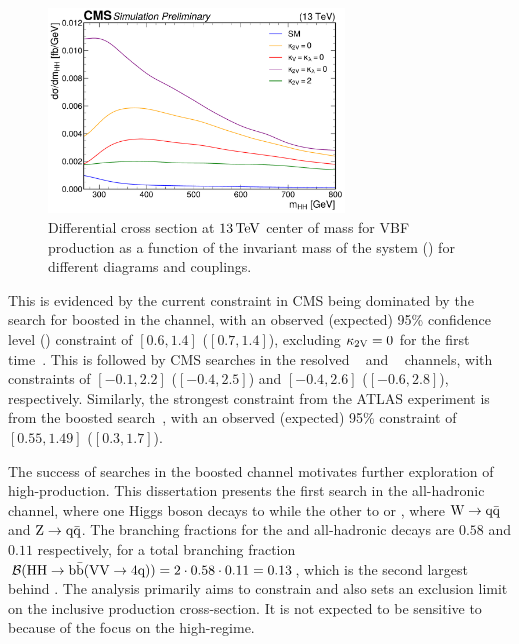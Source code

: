 \begin{figure}[ht]
    \centering
    \includegraphics[width=0.7\textwidth]{figures/05-HH/production/diagrams_prelim.pdf}
    \caption{Differential cross section at $13\,\text{Te\hspace{-.08em}V}$ center of mass for VBF \HH production as a function of the invariant mass of the \HH system (\mHH) for different diagrams and couplings.}
    \label{fig:05_intro_mhh}
\end{figure}

This is evidenced by the current \kapvv constraint in CMS being dominated by the search for boosted \HH in the \bbbb channel, with an observed (expected) 95\% confidence level (\CL) constraint of $[0.6, 1.4]$ ($[0.7, 1.4]$), excluding $\kappa_{2\textrm{V}} = 0$ for the first time~\cite{CMS:2022gjd}.
This is followed by CMS searches in the resolved \bbbb~\cite{CMS:2022cpr} and \bbtautau~\cite{CMS:2022hgz} channels, with constraints of $[-0.1, 2.2]$ ($[-0.4, 2.5]$) and $[-0.4, 2.6]$ ($[-0.6, 2.8]$), respectively.
Similarly, the strongest \kapvv constraint from the ATLAS experiment is from the boosted \bbbb search~\cite{ATLAS-CONF-2024-003}, with an observed (expected) 95\% \CL constraint of $[0.55, 1.49]$ ($[0.3, 1.7]$).

The success of searches in the boosted \bbbb channel motivates further exploration of high-\mHH \HH production.
This dissertation presents the first search in the all-hadronic \bbvv channel, where one Higgs boson decays to \bbbar while the other to \ww or \zz, where $\textrm{W}\to\textrm{q}\bar{\textrm{q}}$ and $\textrm{Z}\to\textrm{q}\bar{\textrm{q}}$.
The branching fractions for the \bbbar and all-hadronic \VV decays are $0.58$ and $0.11$ respectively, for a total branching fraction $\mathcal{B}({\textrm{H}\textrm{H}\to\textrm{b}\bar{\textrm{b}}(\textrm{V}\textrm{V}\to4\textrm{q})}) = 2  \cdot0.58\cdot 0.11 = 0.13$, which is the second largest behind \bbbb.
The analysis primarily aims to constrain \kapvv and also sets an exclusion limit on the inclusive \HH production cross-section.
It is not expected to be sensitive to \kapl because of the focus on the high-\mHH regime.

